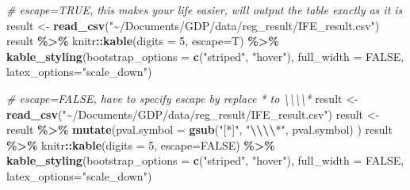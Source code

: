 \documentclass[
  a4paper,
  twoside,
  openright]{book}
\newenvironment{Shaded}{\begin{snugshade}}{\end{snugshade}}
\newcommand{\AttributeTok}[1]{\textcolor[rgb]{0.13,0.29,0.53}{#1}}
\newcommand{\CommentTok}[1]{\textcolor[rgb]{0.56,0.35,0.01}{\textit{#1}}}
\newcommand{\ConstantTok}[1]{\textcolor[rgb]{0.56,0.35,0.01}{#1}}
\newcommand{\DecValTok}[1]{\textcolor[rgb]{0.00,0.00,0.81}{#1}}
\newcommand{\FunctionTok}[1]{\textcolor[rgb]{0.13,0.29,0.53}{\textbf{#1}}}
\newcommand{\NormalTok}[1]{#1}
\newcommand{\OtherTok}[1]{\textcolor[rgb]{0.56,0.35,0.01}{#1}}
\newcommand{\SpecialCharTok}[1]{\textcolor[rgb]{0.81,0.36,0.00}{\textbf{#1}}}
\newcommand{\StringTok}[1]{\textcolor[rgb]{0.31,0.60,0.02}{#1}}
\theoremstyle{definition}
\theoremstyle{definition}
\theoremstyle{definition}
\theoremstyle{definition}
\theoremstyle{remark}
\begin{document}
\begin{Shaded}
\begin{Highlighting}[]
\CommentTok{\# escape=TRUE, this makes your life easier, will output the table exactly as it is}
\NormalTok{result }\OtherTok{\textless{}{-}} \FunctionTok{read\_csv}\NormalTok{(}\StringTok{"\textasciitilde{}/Documents/GDP/data/reg\_result/IFE\_result.csv"}\NormalTok{)}
\NormalTok{result }\SpecialCharTok{\%\textgreater{}\%}
\NormalTok{  knitr}\SpecialCharTok{::}\FunctionTok{kable}\NormalTok{(}\AttributeTok{digits =} \DecValTok{5}\NormalTok{, }\AttributeTok{escape=}\NormalTok{T) }\SpecialCharTok{\%\textgreater{}\%}
  \FunctionTok{kable\_styling}\NormalTok{(}\AttributeTok{bootstrap\_options =} \FunctionTok{c}\NormalTok{(}\StringTok{"striped"}\NormalTok{, }\StringTok{"hover"}\NormalTok{), }\AttributeTok{full\_width =} \ConstantTok{FALSE}\NormalTok{, }\AttributeTok{latex\_options=}\StringTok{"scale\_down"}\NormalTok{)}
\end{Highlighting}
\end{Shaded}

\begin{Shaded}
\begin{Highlighting}[]
\CommentTok{\# escape=FALSE, have to specify escape by replace \textasciigrave{}*\textasciigrave{} to \textasciigrave{}\textbackslash{}\textbackslash{}\textbackslash{}\textbackslash{}*\textasciigrave{}}
\NormalTok{result }\OtherTok{\textless{}{-}} \FunctionTok{read\_csv}\NormalTok{(}\StringTok{"\textasciitilde{}/Documents/GDP/data/reg\_result/IFE\_result.csv"}\NormalTok{)}
\NormalTok{result }\OtherTok{\textless{}{-}}\NormalTok{ result }\SpecialCharTok{\%\textgreater{}\%} 
  \FunctionTok{mutate}\NormalTok{(}\AttributeTok{pval.symbol =} \FunctionTok{gsub}\NormalTok{(}\StringTok{"[*]"}\NormalTok{, }\StringTok{"}\SpecialCharTok{\textbackslash{}\textbackslash{}\textbackslash{}\textbackslash{}}\StringTok{*"}\NormalTok{, pval.symbol) )}
\NormalTok{result }\SpecialCharTok{\%\textgreater{}\%}
\NormalTok{  knitr}\SpecialCharTok{::}\FunctionTok{kable}\NormalTok{(}\AttributeTok{digits =} \DecValTok{5}\NormalTok{, }\AttributeTok{escape=}\ConstantTok{FALSE}\NormalTok{) }\SpecialCharTok{\%\textgreater{}\%}
  \FunctionTok{kable\_styling}\NormalTok{(}\AttributeTok{bootstrap\_options =} \FunctionTok{c}\NormalTok{(}\StringTok{"striped"}\NormalTok{, }\StringTok{"hover"}\NormalTok{), }\AttributeTok{full\_width =} \ConstantTok{FALSE}\NormalTok{, }\AttributeTok{latex\_options=}\StringTok{"scale\_down"}\NormalTok{)}
\end{Highlighting}
\end{Shaded}
\end{document}

